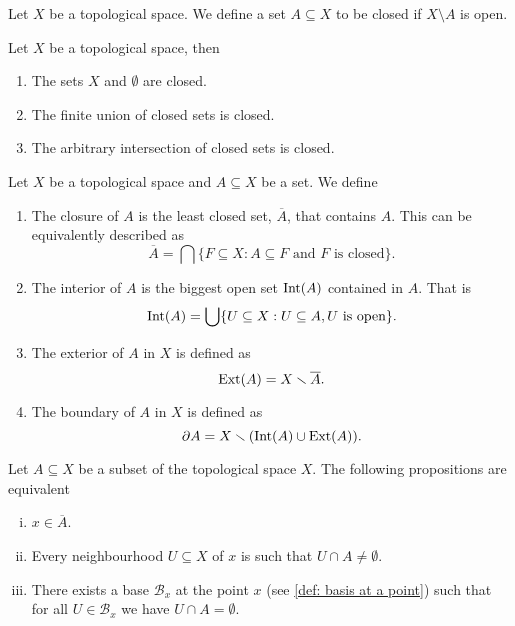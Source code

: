 \begin{definition}
Let \(X\) be a topological space. We define a set \(A \subseteq X\) to be
closed if \(X \setminus A\) is open.
\end{definition}

\begin{proposition}
Let \(X\) be a topological space, then
\begin{enumerate}
  \item The sets \(X\) and \(\emptyset\) are closed.
  \item The finite union of closed sets is closed.
  \item The arbitrary intersection of closed sets is closed.
\end{enumerate}
\end{proposition}

\begin{definition}[Miscelaneous]
Let \(X\) be a topological space and \(A \subseteq X\) be a set. We define
\begin{enumerate}
  \item\label{def: closure}
    The closure of \(A\) is the least closed set, \(\overline A\), that
    contains \(A\). This can be equivalently described as
    \[
      \overline A = \bigcap \{F \subseteq X : A \subseteq F \text{ and } F
      \text{ is closed}\}.
    \]
  \item\label{def: interior}
    The interior of \(A\) is the biggest open set \(\operatorname{Int}(A)\) contained in
    \(A\). That is
      \[
        \operatorname{Int}(A) = \bigcup \{U \subseteq X : U \subseteq A, U \text{ is open}\}.
    \]
  \item\label{def: exterior}
    The exterior of \(A\) in \(X\) is defined as
    \[
      \operatorname{Ext}(A) = X \smallsetminus \overline A.
    \]
  \item\label{def: boundary}
    The boundary of \(A\) in \(X\) is defined as
    \[
      \partial A = X \smallsetminus (\operatorname{Int}(A) \cup \operatorname{Ext}(A)).
    \]
\end{enumerate}
\end{definition}

\begin{proposition}\label{prop: closure equivalent prop}
Let \(A \subseteq X\) be a subset of the topological space \(X\). The
following propositions are equivalent
\begin{enumerate}[(i)]
  \item \(x \in \overline A\).
  \item Every neighbourhood \(U \subseteq X\) of \(x\) is such that \(U
    \cap A \neq \emptyset\).
  \item There exists a base \(\mathcal B_x\) at the point \(x\) (see
    \cref{def: basis at a point}) such that for all \(U \in \mathcal B_x\) we
    have \(U \cap A = \emptyset\).
\end{enumerate}
\end{proposition}


